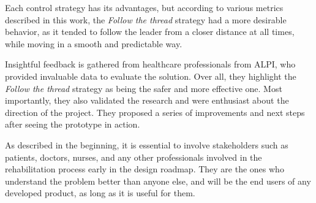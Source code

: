 \documentclass[journal]{IEEEtran}
\begin{document}
Each control strategy has its advantages, but according to various metrics described in this work, the \textit{Follow the thread} strategy had a more desirable behavior, as it tended to follow the leader from a closer distance at all times, while moving in a smooth and predictable way. 

Insightful feedback is gathered from healthcare professionals from ALPI, who provided invaluable data to evaluate the solution. Over all, they highlight the \textit{Follow the thread} strategy as being the safer and more effective one. Most importantly, they also validated the research and were enthusiast about the direction of the project. They proposed a series of improvements and next steps after seeing the prototype in action.

As described in the beginning, it is essential to involve stakeholders such as patients, doctors, nurses, and any other professionals involved in the rehabilitation process early in the design roadmap. They are the ones who understand the problem better than anyone else, and will be the end users of any developed product, as long as it is useful for them.





\end{document}
